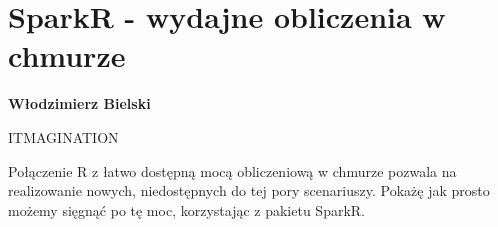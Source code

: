 \documentclass[\main/boa.tex]{subfiles}
\begin{document}
\section{SparkR - wydajne obliczenia w chmurze}

\begin{minipage}{0.915\textwidth}
	\centering
  {\bf {} Włodzimierz Bielski}
\end{minipage}



\begin{affiliations}
\begin{minipage}{0.915\textwidth}
\centering
ITMAGINATION  \\[-2pt]
\end{minipage}
\end{affiliations}

\vskip 0.3cm

 Połączenie R z łatwo dostępną mocą obliczeniową w chmurze pozwala na realizowanie nowych, niedostępnych do tej pory scenariuszy. Pokażę jak prosto możemy sięgnąć po tę moc, korzystając z pakietu SparkR. 
\end{document}
